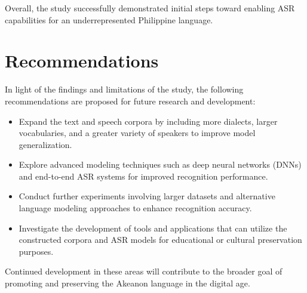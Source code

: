 Overall, the study successfully demonstrated initial steps toward enabling ASR capabilities for an underrepresented Philippine language.

\section{Recommendations}

In light of the findings and limitations of the study, the following recommendations are proposed for future research and development:
\begin{itemize}
    \item Expand the text and speech corpora by including more dialects, larger vocabularies, and a greater variety of speakers to improve model generalization.
    \item Explore advanced modeling techniques such as deep neural networks (DNNs) and end-to-end ASR systems for improved recognition performance.
    \item Conduct further experiments involving larger datasets and alternative language modeling approaches to enhance recognition accuracy.
    \item Investigate the development of tools and applications that can utilize the constructed corpora and ASR models for educational or cultural preservation purposes.
\end{itemize}

Continued development in these areas will contribute to the broader goal of promoting and preserving the Akeanon language in the digital age.

